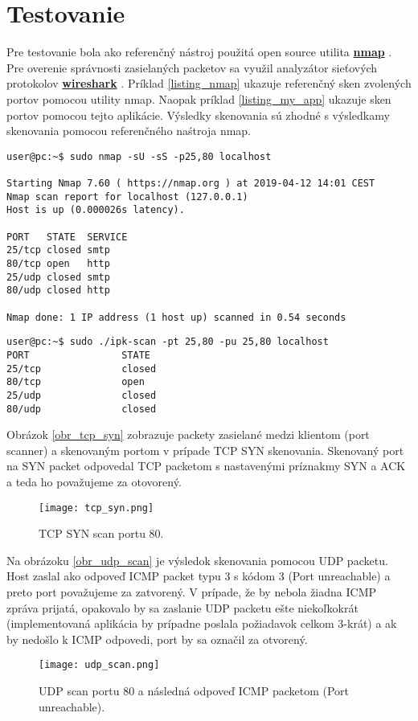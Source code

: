 \documentclass[a4paper, 11pt]{article}
\begin{document}
\section{Testovanie}
Pre testovanie bola ako referenčný nástroj použitá open source utilita \href{https://nmap.org/}{\textbf{nmap}} . Pre overenie správnosti zasielaných packetov sa využil analyzátor sieťových protokolov \href{https://www.wireshark.org/}{\textbf{wireshark}} . Príklad \ref{listing_nmap} ukazuje referenčný sken zvolených portov pomocou utility nmap. Naopak príklad \ref{listing_my_app} ukazuje sken portov pomocou tejto aplikácie. Výsledky skenovania sú zhodné s výsledkamy skenovania pomocou referenčného naśtroja nmap.

\begin{lstlisting}[caption={Príklad skenovania pomocou utility nmap.}, label={listing_nmap}]
user@pc:~$ sudo nmap -sU -sS -p25,80 localhost

Starting Nmap 7.60 ( https://nmap.org ) at 2019-04-12 14:01 CEST
Nmap scan report for localhost (127.0.0.1)
Host is up (0.000026s latency).

PORT   STATE  SERVICE
25/tcp closed smtp
80/tcp open   http
25/udp closed smtp
80/udp closed http

Nmap done: 1 IP address (1 host up) scanned in 0.54 seconds
\end{lstlisting}

\begin{lstlisting}[caption={Príklad skenovania portov touto aplikáciou.}, label={listing_my_app}]
user@pc:~$ sudo ./ipk-scan -pt 25,80 -pu 25,80 localhost
PORT                STATE
25/tcp              closed
80/tcp              open
25/udp              closed
80/udp              closed
\end{lstlisting}

Obrázok \ref{obr_tcp_syn} zobrazuje packety zasielané medzi klientom (port scanner) a skenovaným portom v prípade TCP SYN skenovania. Skenovaný port na SYN packet odpovedal TCP packetom s nastavenými príznakmy SYN a ACK a teda ho považujeme za otovorený.
\begin{figure}[H] 
	\centering
	\texttt{[image: tcp\_syn.png]}
	\caption{TCP SYN scan portu 80.}
	\label{obr1}
\end{figure} \label{obr_tcp_syn}

Na obrázoku \ref{obr_udp_scan} je výsledok skenovania pomocou UDP packetu. Host zaslal ako odpoveď ICMP packet typu 3 s kódom 3 (Port unreachable) a preto port považujeme za zatvorený. V prípade, že by nebola žiadna ICMP zpráva prijatá, opakovalo by sa zaslanie UDP packetu ešte niekoľkokrát (implementovaná aplikácia by prípadne poslala požiadavok celkom 3-krát) a ak by nedošlo k ICMP odpovedi, port by sa označil za otvorený.

\begin{figure}[H] 
	\centering
	\texttt{[image: udp\_scan.png]}
	\caption{UDP scan portu 80 a následná odpoveď ICMP packetom (Port unreachable).}
	\label{obr1}
\end{figure} \label{obr_udp_scan}

\newpage


\end{document}
